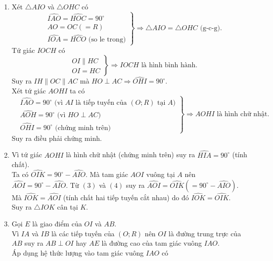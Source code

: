 \begin{bt}
{\begin{enumerate}
\[\begin{aligned}
	& AB \perp OI\\
	& AB \perp BC
	\end{aligned} \right\} \Rightarrow OI\parallel BC \text{ (từ vuông góc đến song song)}.\]
	Suy ra điều phải chứng minh.
	\item 
	Xét $\triangle AIO$ và $\triangle OHC$ có
	\[ \left. \begin{aligned}
	& \widehat{IAO}=\widehat{HOC}=90^\circ\\
	& AO=OC\left(=R\right)\\
	& \widehat{IOA}=\widehat{HCO} \text{ (so le trong)}
	\end{aligned} \right\} \Rightarrow \triangle AIO=\triangle OHC \text{ (g-c-g)}.\]
	Tứ giác $IOCH$ có
	\[ \left. \begin{aligned}
	& OI\parallel HC\\
	& OI=HC
	\end{aligned} \right\} \Rightarrow IOCH \text{ là hình bình hành}.\]
	Suy ra $IH \parallel OC\parallel AC$ mà $HO \perp AC\Rightarrow \widehat{OHI}=90^\circ$.\\ 
	Xét tứ giác $AOHI$ ta có
	\[ \left. \begin{aligned}
	& \widehat{IAO}=90^\circ \text{ (vì $AI$ là tiếp tuyến của $(O;R)$ tại $A$)}\\
	& \widehat{AOH}=90^\circ \text{ (vì $HO \perp AC$)}\\
	& \widehat{OHI}=90^\circ \text{ (chứng minh trên)}
	\end{aligned} \right\} \Rightarrow AOHI \text{ là hình chữ nhật}.\]
	Suy ra điều phải chứng minh.
	\item Vì tứ giác $AOHI$ là hình chữ nhật (chứng minh trên) suy ra $\widehat{HIA}=90^\circ $ (tính chất).\\
	Ta có $\widehat{OIK}=90^\circ-\widehat{AIO}$. 
	Mà tam giác $ AOI$ vuông tại $A$ nên $\widehat{AOI}=90^\circ-\widehat{AIO}$. 
	Từ $(3)$ và $(4)$ suy ra $\widehat{AOI}=\widehat{OIK}(=90^\circ-\widehat{AIO})$.\\
	Mà $\widehat{IOK}=\widehat{AOI}$ (tính chất hai tiếp tuyến cắt nhau) do đó $\widehat{IOK}=\widehat{OIK}$.\\
	Suy ra $\triangle IOK$ cân tại $K$.
	\item Gọi $E$ là giao điểm của $OI$ và $AB$.\\
	Vì $IA$ và $IB$ là các tiếp tuyến của $(O;R)$ nên $OI$ là đường trung trực của $AB$ suy ra $AB \perp OI$ hay $AE$ là đường cao của tam giác vuông $IAO$.\\
	Áp dụng hệ thức lượng vào tam giác vuông $IAO$ có

\end{enumerate}}
\end{bt}
